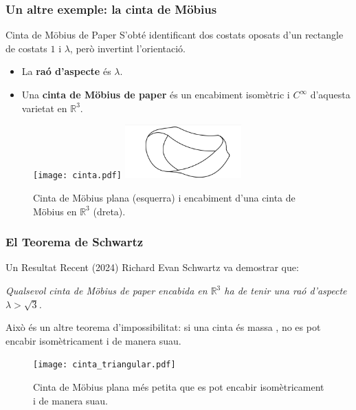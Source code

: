 \documentclass[10pt]{beamer}
\begin{document}
\begin{frame}
    \frametitle{Un altre exemple: la cinta de Möbius}
    
    \begin{block}{Cinta de Möbius de Paper}
        S'obté identificant dos costats oposats d'un rectangle de costats $1$ i $\lambda$, però invertint l'orientació.
        \begin{itemize}
            \item La \textbf{raó d'aspecte} és $\lambda$.
            \item Una \textbf{cinta de Möbius de paper} és un encabiment isomètric i $C^\infty$ d'aquesta varietat en $\mathbb{R}^3$.
        \end{itemize}
    \end{block}

    \begin{figure}
        \centering
        \texttt{[image: cinta.pdf]}
        \includegraphics[width=0.4\textwidth]{encabida.jpg}
        \caption{Cinta de Möbius plana (esquerra) i encabiment d'una cinta de Möbius en $\mathbb{R}^3$ (dreta).}
    \end{figure}
    
\end{frame}

\begin{frame}
    \frametitle{El Teorema de Schwartz}

    \begin{block}{Un Resultat Recent (2024)}
        Richard Evan Schwartz va demostrar que:
        \vspace{0.5cm}
        \begin{center}
            \textit{Qualsevol cinta de Möbius de paper encabida en $\mathbb{R}^3$ ha de tenir una raó d'aspecte $\lambda > \sqrt{3}$.}
        \end{center}
        \vspace{0.5cm}
        Això és un altre teorema d'impossibilitat: si una cinta és massa , no es pot encabir isomètricament i de manera suau.
    \end{block}
    
    \begin{figure}
        \centering
        \texttt{[image: cinta\_triangular.pdf]}
        \caption{Cinta de Möbius plana més petita que es pot encabir isomètricament i de manera suau.}
    \end{figure}
    
\end{frame}
\end{document}
